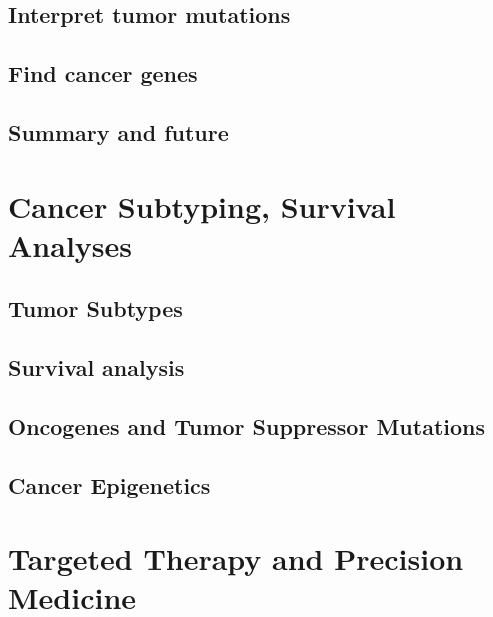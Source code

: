 \documentclass[
]{book}
\begin{document}
\hypertarget{interpret-tumor-mutations}{%
\section{Interpret tumor mutations}\label{interpret-tumor-mutations}}

\hypertarget{find-cancer-genes}{%
\section{Find cancer genes}\label{find-cancer-genes}}

\hypertarget{summary-and-future}{%
\section{Summary and future}\label{summary-and-future}}

\hypertarget{cancersub}{%
\chapter{Cancer Subtyping, Survival Analyses}\label{cancersub}}

\hypertarget{tumor-subtypes}{%
\section{Tumor Subtypes}\label{tumor-subtypes}}

\hypertarget{survival-analysis}{%
\section{Survival analysis}\label{survival-analysis}}

\hypertarget{oncogenes-and-tumor-suppressor-mutations}{%
\section{Oncogenes and Tumor Suppressor Mutations}\label{oncogenes-and-tumor-suppressor-mutations}}

\hypertarget{cancer-epigenetics}{%
\section{Cancer Epigenetics}\label{cancer-epigenetics}}

\hypertarget{PrecisionMedicine}{%
\chapter{Targeted Therapy and Precision Medicine}\label{PrecisionMedicine}}
\end{document}
